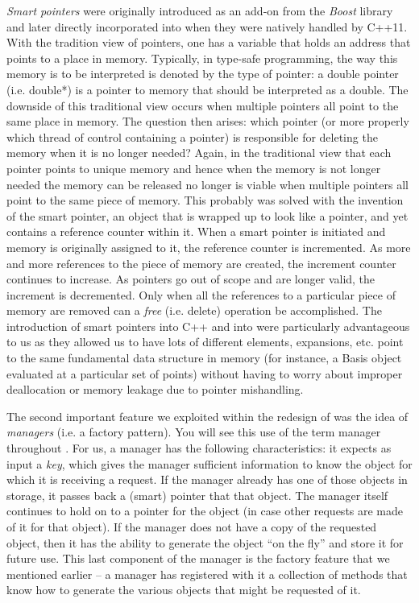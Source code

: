 {\em Smart pointers} were originally introduced as an add-on from the {\em Boost} library and later directly incorporated into {\nek} when
they were natively handled by C++11.  With the tradition view of pointers, one has a variable that holds an address that points to a place in memory.  Typically, in type-safe programming, the way this memory is to be interpreted is denoted by the type of pointer:  a double pointer (i.e. double*) is a pointer
to memory that should be interpreted as a double.  The downside of this traditional view occurs when multiple pointers all point to the same place in memory.  The question then arises: which pointer (or more properly which thread of control containing a pointer) is responsible for deleting the memory
when it is no longer needed?  Again, in the traditional view that each pointer points to unique memory and hence when the memory is not longer needed
the memory can be released no longer is viable when multiple pointers all point to the same piece of memory.  This probably was solved with the
invention of the smart pointer, an object that is wrapped up to look like a pointer, and yet contains a reference counter within it.  When a smart
pointer is initiated and memory is originally assigned to it, the reference counter is incremented.  As more and more references to the piece of memory
are created, the increment counter continues to increase.  As pointers go out of scope and are longer valid, the increment is decremented.  Only
when all the references to a particular piece of memory are removed can a {\em free} (i.e. delete) operation be accomplished.   The introduction
of smart pointers into C++ and into {\nek} were particularly advantageous to us as they allowed us to have lots of different elements, expansions, etc.
point to the same fundamental data structure in memory (for instance, a Basis object evaluated at a particular set of points) without having to worry
about improper deallocation or memory leakage due to pointer mishandling.

The second important feature we exploited within the redesign of {\nek} was the idea of {\em managers} (i.e. a factory pattern).  You will
see this use of the term manager throughout {\nek}.  For us, a manager has the following characteristics:  it expects as input a {\em key}, which
gives the manager sufficient information to know the object for which it is receiving a request.  If the manager already has one of those objects
in storage, it passes back a (smart) pointer that that object.  The manager itself continues to hold on to a pointer for the object (in case other
requests are made of it for that object).  If the manager does not have a copy of the requested object, then it has the ability to generate 
the object ``on the fly'' and store it for future use.  This last component of the manager is the factory feature that we mentioned earlier -- a
manager has registered with it a collection of methods that know how to generate the various objects that might be requested of it.


